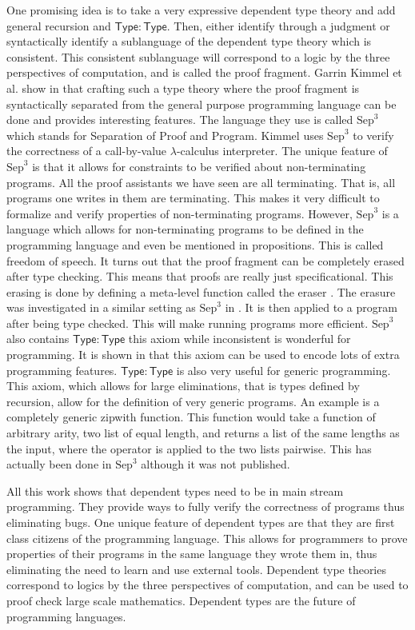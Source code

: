One promising idea is to take a very expressive dependent type theory
and add general recursion and $\mathsf{Type:Type}$.  Then, either
identify through a judgment or syntactically identify a sublanguage of
the dependent type theory which is consistent.  This consistent
sublanguage will correspond to a logic by the three perspectives of
computation, and is called the proof fragment.  Garrin Kimmel et
al. show in \cite{Kimmel:2012} that crafting such a type theory where
the proof fragment is syntactically separated from the general purpose
programming language can be done and provides interesting features.
The language they use is called $\text{Sep}^3$ which stands for
Separation of Proof and Program. Kimmel uses $\text{Sep}^3$ to verify
the correctness of a call-by-value $\lambda$-calculus interpreter.
The unique feature of $\text{Sep}^3$ is that it allows for constraints
to be verified about non-terminating programs.  All the proof
assistants we have seen are all terminating.  That is, all programs one
writes in them are terminating.  This makes it very difficult to
formalize and verify properties of non-terminating programs.  However,
$\text{Sep}^3$ is a language which allows for non-terminating programs
to be defined in the programming language and even be mentioned in
propositions.  This is called freedom of speech.  It turns out that
the proof fragment can be completely erased after type checking.  This
means that proofs are really just specificational.  This erasing is
done by defining a meta-level function called the eraser
\cite{Mishra-Linger:2008}.  The erasure was investigated in a similar
setting as $\text{Sep}^3$ in \cite{Sjoberg:2012}.  It is then applied
to a program after being type checked.  This will make running
programs more efficient.  $\text{Sep}^3$ also contains
$\mathsf{Type:Type}$ this axiom while inconsistent is wonderful for
programming.  It is shown in \cite{Cardelli-1986} that this axiom can
be used to encode lots of extra programming features.
$\mathsf{Type:Type}$ is also very useful for generic programming.
This axiom, which allows for large eliminations, that is types defined by
recursion, allow for the definition of very generic programs.  An
example is a completely generic zipwith function.  This function would
take a function of arbitrary arity, two list of equal length, and
returns a list of the same lengths as the input, where the operator is
applied to the two lists pairwise.  This has actually been done in
$\text{Sep}^3$ although it was not published.

All this work shows that dependent types need to be in main stream
programming.  They provide ways to fully verify the correctness of
programs thus eliminating bugs.  One unique feature of dependent types
are that they are first class citizens of the programming language.
This allows for programmers to prove properties of their programs in
the same language they wrote them in,  thus eliminating the need to
learn and use external tools.  Dependent type theories correspond to
logics by the three perspectives of computation, and can be used to
proof check large scale mathematics.  Dependent types are the future
of programming languages.

